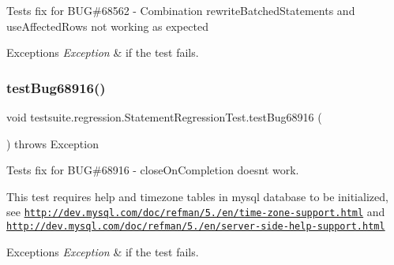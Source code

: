 Tests fix for B\+UG\#68562 -\/ Combination rewrite\+Batched\+Statements and use\+Affected\+Rows not working as expected


\begin{DoxyExceptions}{Exceptions}
{\em Exception} & if the test fails. \\
\hline
\end{DoxyExceptions}
\mbox{\label{classtestsuite_1_1regression_1_1_statement_regression_test_a23f5d3d3b8c4eb0019effe8aadd4b4b2}} 
\subsubsection{\texorpdfstring{test\+Bug68916()}{testBug68916()}}
{\footnotesize\ttfamily void testsuite.\+regression.\+Statement\+Regression\+Test.\+test\+Bug68916 (\begin{DoxyParamCaption}{ }\end{DoxyParamCaption}) throws Exception}

Tests fix for B\+UG\#68916 -\/ close\+On\+Completion doesn\textquotesingle{}t work.

This test requires help and timezone tables in mysql database to be initialized, see \href{http://dev.mysql.com/doc/refman/5.7/en/time-zone-support.html}{\tt http\+://dev.\+mysql.\+com/doc/refman/5./en/time-\/zone-\/support.\+html} and \href{http://dev.mysql.com/doc/refman/5.7/en/server-side-help-support.html}{\tt http\+://dev.\+mysql.\+com/doc/refman/5./en/server-\/side-\/help-\/support.\+html}


\begin{DoxyExceptions}{Exceptions}
{\em Exception} & if the test fails. \\
\hline
\end{DoxyExceptions}
\mbox{\label{classtestsuite_1_1regression_1_1_statement_regression_test_a1e38b360b51a8f9704cef9040eb6a44d}} 
